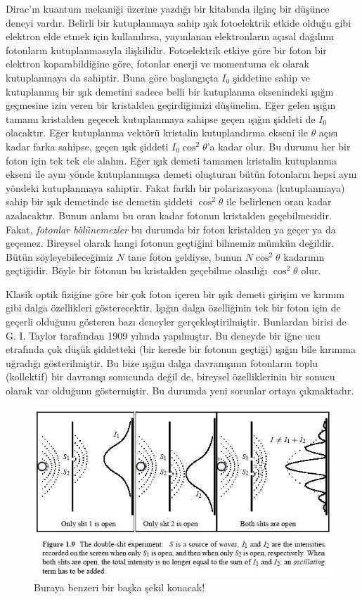 \documentclass[a4paper,12pt, twoside]{article}
\begin{document}
Dirac'ın kuantum mekaniği üzerine yazdığı bir kitabında ilginç bir düşünce deneyi vardır. Belirli bir kutuplanmaya sahip ışık fotoelektrik etkide olduğu gibi elektron elde etmek için kullanılırsa, yayınlanan elektronların açısal dağılımı fotonların kutuplanmasıyla ilişkilidir. Fotoelektrik etkiye göre bir foton bir elektron koparabildiğine göre, fotonlar enerji ve momentuma ek olarak kutuplanmaya da sahiptir. Buna göre başlangıçta $I_0$ şiddetine sahip ve kutuplanmış bir ışık demetini sadece belli bir kutuplanma eksenindeki ışığın geçmesine izin veren bir kristalden geçirdiğimizi düşünelim. Eğer gelen ışığın tamamı kristalden geçecek kutuplanmaya sahipse geçen ışığın şiddeti de $I_0$ olacaktır. Eğer kutuplanma vektörü kristalin kutuplandırma ekseni ile $\theta$ açısı kadar farka sahipse, geçen ışık şiddeti $I_0 \cos^2 \theta$'a kadar olur. Bu durumu her bir foton için tek tek ele alalım. Eğer ışık demeti tamamen kristalin kutuplanma ekseni ile aynı yönde kutuplanmışsa demeti oluşturan bütün fotonların hepsi aynı yöndeki kutuplanmaya sahiptir. Fakat farklı bir polarizasyona (kutuplanmaya) sahip bir ışık demetinde ise demetin şiddeti  $\cos^2 \theta$ ile belirlenen oran kadar azalacaktır. Bunun anlamı bu oran kadar fotonun kristalden geçebilmesidir. Fakat, \emph{fotonlar bölünemezler} bu durumda bir foton kristalden ya geçer ya da geçemez. Bireysel olarak hangi fotonun geçtiğini bilmemiz mümkün değildir. Bütün söyleyebileceğimiz $N$ tane foton geldiyse, bunun $N \cos^2 \theta$ kadarının geçtiğidir. Böyle bir fotonun bu kristalden geçebilme olasılığı $\cos^2\theta$ olur.

Klasik optik fiziğine göre  bir çok foton içeren bir ışık demeti girişim ve kırınım gibi dalga özellikleri gösterecektir. Işığın dalga özelliğinin tek bir foton için de geçerli olduğunu gösteren bazı deneyler gerçekleştirilmiştir. Bunlardan birisi de G. I. Taylor tarafından 1909 yılında yapılmıştır. Bu deneyde bir iğne ucu etrafında çok düşük şiddetteki (bir kerede bir fotonun geçtiği) ışığın bile kırınıma uğradığı gösterilmiştir. Bu bize ışığın dalga davranışının fotonların toplu (kollektif) bir davranışı sonucunda değil de, bireysel özelliklerinin bir sonucu olarak var olduğunu göstermiştir. Bu durumda yeni sorunlar ortaya çıkmaktadır.


\begin{figure}[hbtp]
\center
\includegraphics[scale=.8]{Double-slit_experiment_unknown_source.png}
\caption{Buraya benzeri bir başka şekil konacak!}
\label{fig:dobule_slit_experiment}
\end{figure}
\end{document}
